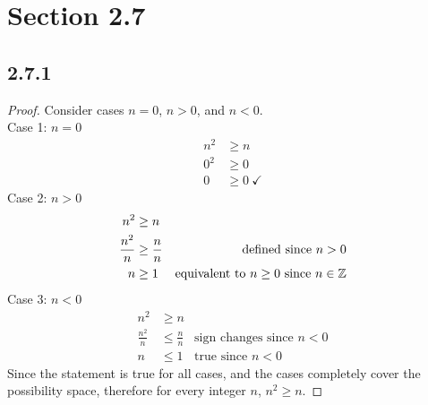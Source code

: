 





\section*{Section 2.7}

\subsection*{2.7.1}
\begin{enumerate}
  \begin{proof}
    Consider cases $n = 0$, $n > 0$, and $n < 0$. \\
    Case 1: $n=0$
    \begin{align*}
      n^2 & \geq n            \\
      0^2 & \geq 0            \\
      0   & \geq 0~\checkmark
    \end{align*}
    Case 2: $n > 0$
    \begin{align*}
      n^2           & \geq n                                                                  \\
      \frac{n^2}{n} & \geq \frac{n}{n} & \text{defined since $n > 0$}                         \\
      n             & \geq 1           & \text{equivalent to $n \geq 0$ since $n \in \mathbb{Z}$}
    \end{align*}
    Case 3: $n < 0$
    \begin{align*}
      n^2           & \geq n                                               \\
      \frac{n^2}{n} & \leq \frac{n}{n} & \text{sign changes since $n < 0$} \\
      n             & \leq 1           & \text{true since $n < 0$}
    \end{align*}
    Since the statement is true for all cases, and the cases completely cover the possibility space, therefore for every integer $n$, $n^2 \geq n$.
  \end{proof}
\end{enumerate}

